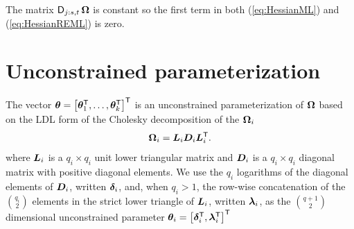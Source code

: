 \documentclass[12pt]{article}
\begin{document}
The matrix $\operatorname{\mathsf{D}}_{j:s,t}\bm{\Omega}$ is constant so the first term in both
(\ref{eq:HessianML}) and (\ref{eq:HessianREML}) is zero.

\section{Unconstrained parameterization}
\label{sec:Unconstrained}

The vector
$\bm{\theta}=\left[\bm{\theta}_1^\mathsf{T},\dots,\bm{\theta}_k^\mathsf{T}\right]^\mathsf{T}$ is
an unconstrained parameterization of $\bm{\Omega}$ based on the LDL form
of the Cholesky decomposition of the $\bm{\Omega}_i$
\begin{equation}
  \label{eq:OmegaLDL}
  \bm{\Omega}_i=\bm{L}_i\bm{D}_i\bm{L}_i^\mathsf{T} .
\end{equation}
where $\bm{L}_i$ is a $q_i\times q_i$ unit lower triangular matrix and
$\bm{D}_i$ is a $q_i\times q_i$ diagonal matrix with positive diagonal
elements.  We use the $q_i$ logarithms of the diagonal elements of
$\bm{D}_i$, written $\bm{\delta}_i$, and, when $q_i>1$, the row-wise
concatenation of the $\binom{q_i}{2}$ elements in the strict lower
triangle of $\bm{L}_i$, written $\bm{\lambda}_i$, as the $\binom{q+1}{2}$
dimensional unconstrained parameter
$\bm{\theta}_i=\left[\bm{\delta}_i^\mathsf{T},\bm{\lambda}_i^\mathsf{T}\right]^\mathsf{T}$
\end{document}
